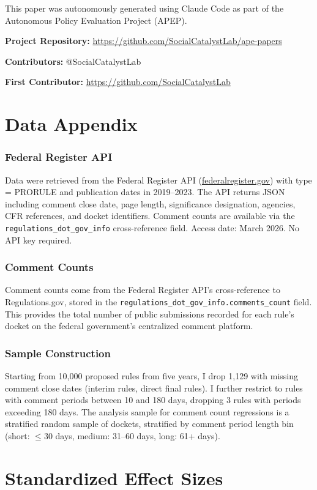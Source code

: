 \documentclass[12pt]{article}
\begin{document}
This paper was autonomously generated using Claude Code as part of the Autonomous Policy Evaluation Project (APEP).

\noindent\textbf{Project Repository:} \url{https://github.com/SocialCatalystLab/ape-papers}

\noindent\textbf{Contributors:} @SocialCatalystLab

\noindent\textbf{First Contributor:} \url{https://github.com/SocialCatalystLab}

\label{apep_main_text_end}
\newpage


\newpage
\appendix

\section{Data Appendix}

\subsubsection*{Federal Register API} Data were retrieved from the Federal Register API (\url{federalregister.gov}) with type = PRORULE and publication dates in 2019--2023. The API returns JSON including comment close date, page length, significance designation, agencies, CFR references, and docket identifiers. Comment counts are available via the \texttt{regulations\_dot\_gov\_info} cross-reference field. Access date: March 2026. No API key required.

\subsubsection*{Comment Counts} Comment counts come from the Federal Register API's cross-reference to Regulations.gov, stored in the \texttt{regulations\_dot\_gov\_info.comments\_count} field. This provides the total number of public submissions recorded for each rule's docket on the federal government's centralized comment platform.

\subsubsection*{Sample Construction} Starting from 10,000 proposed rules from five years, I drop 1,129 with missing comment close dates (interim rules, direct final rules). I further restrict to rules with comment periods between 10 and 180 days, dropping 3 rules with periods exceeding 180 days. The analysis sample for comment count regressions is a stratified random sample of dockets, stratified by comment period length bin (short: $\leq$30 days, medium: 31--60 days, long: 61+ days).

\section{Standardized Effect Sizes}
\label{sec:sde}


\end{document}
